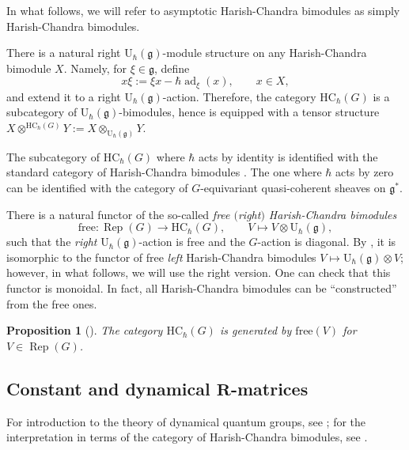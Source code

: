 \documentclass[10pt,a4paper]{article}
\numberwithin{equation}{section}
\newtheorem{Proposition}[Theorem]{Proposition}
{ \theoremstyle{definition}
	\newtheorem{Definition}[Theorem]{Definition}
	\newtheorem{Note}[Theorem]{Note}
	\newtheorem{Example}[Theorem]{Example}
	\newtheorem{Remark}[Theorem]{Remark} }
\newcommand{\U}{\mathrm{U}_{\hbar}}
\newcommand{\g}{\mathfrak{g}}
\DeclareMathOperator{\ad}{ad}
\newcommand{\free}{\mathrm{free}}
\newcommand{\HC}{\mathrm{HC}_{\hbar}}
\DeclareMathOperator{\Rep}{Rep}
\begin{document}
	In what follows, we will refer to asymptotic Harish-Chandra bimodules as simply Harish-Chandra bimodules.
	
	There is a natural right $\U(\g)$-module structure on any Harish-Chandra bimodule $X$. Namely, for $\xi \in\g$, define
	\begin{equation}
		\label{eq::left_action}
		x\xi := \xi x - \hbar \ad_{\xi}(x),\qquad x\in X,
	\end{equation}
	and extend it to a right $\U(\g)$-action. Therefore, the category $\HC(G)$ is a subcategory of $\U(\g)$-bimodules, hence is equipped with a tensor structure
$
	X \otimes^{\HC(G)} Y := X \otimes_{\U(\g)} Y$.
	
	\begin{Remark}
		The subcategory of $\HC(G)$ where $\hbar$ acts by identity is identified with the standard category of Harish-Chandra bimodules \cite[Definition 5.2]{BernsteinGelfand}. The one where $\hbar$ acts by zero can be identified with the category of $G$-equivariant quasi-coherent sheaves on $\g^*$.
	\end{Remark}
	
	There is a natural functor of the so-called \emph{free $($right$)$ Harish-Chandra bimodules}
	\[
	\free \colon \Rep(G) \rightarrow \HC(G), \qquad V \mapsto V \otimes \U(\g),
	\]
	such that the \emph{right} $\U(\g)$-action is free and the $G$-action is diagonal. By \cite[equation~(28)]{KalmykovSafronov}, it is isomorphic to the functor of free \emph{left} Harish-Chandra bimodules $V \mapsto \U(\g) \otimes V$; however, in what follows, we will use the right version. One can check that this functor is monoidal. In fact, all Harish-Chandra bimodules can be ``constructed'' from the free ones.
	\begin{Proposition}[{\cite[Proposition 2.7]{KalmykovSafronov}}]
		\label{prop::hc_generators}
		The category $\HC(G)$ is generated by $\free(V)$ for $V \in \Rep(G)$.
	\end{Proposition}
	
	\subsection[Constant and dynamical R-matrices]{Constant and dynamical $\boldsymbol{R}$-matrices}
	\label{subsect::dynamica_r_mat}
	For introduction to the theory of dynamical quantum groups, see \cite{EtingofSchiffmann}; for the interpretation in terms of the category of Harish-Chandra bimodules, see \cite{KalmykovSafronov}.
	
\end{document}
